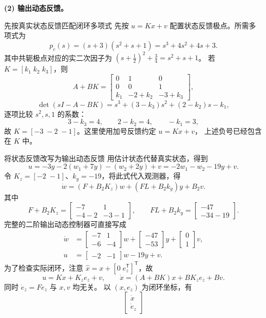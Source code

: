 \documentclass[11pt]{article}
\begin{document}
\begin{solution}
\medskip\textbf{(2) 输出动态反馈。}
\begin{proofstep}{先按真实状态反馈匹配闭环多项式}
先按 $u=Kx+v$ 配置状态反馈极点。所需多项式为
\[
 p_c(s)=(s+3)(s^2+s+1)=s^3+4s^2+4s+3.
\]
其中共轭极点对应的实二次因子为
$\left(s+\tfrac12\right)^2+\tfrac34=s^2+s+1$。
若 $K=[k_1\;k_2\;k_3]$，则
\[
 A+BK=\begin{bmatrix}0&1&0\\0&0&1\\k_1&-2+k_2&-3+k_3\end{bmatrix},
\]
\[
 \det(sI-A-BK)=s^3+(3-k_3)s^2+(2-k_2)s-k_1,
\]
逐项比较 $s^2,s,1$ 的系数：
\[
 3-k_3=4,\qquad 2-k_2=4,\qquad -k_1=3,
\]
故 $K=[-3\;-2\;-1]$。这里使用加号反馈约定 $u=Kx+v$，
上述负号已经包含在 $K$ 中。
\end{proofstep}
\begin{proofstep}{将状态反馈改写为输出动态反馈}
用估计状态代替真实状态，得到
\[
 \boxed{u=-3y-2(w_1+7y)-(w_2+2y)+v
 =-2w_1-w_2-19y+v.}
\]
令 $K_z=[-2\;-1]$、$k_y=-19$，将此式代入观测器，得
\[
 \dot w=(F+B_2K_z)w+(FL+B_2k_y)y+B_2v.
\]
其中
\[
 F+B_2K_z=\begin{bmatrix}-7&1\\-4-2&-3-1\end{bmatrix},\qquad
 FL+B_2k_y=\begin{bmatrix}-47\\-34-19\end{bmatrix}.
\]
完整的二阶输出动态控制器可直接写成
\[
 \boxed{\begin{aligned}
  \dot w&=\begin{bmatrix}-7&1\\-6&-4\end{bmatrix}w
   +\begin{bmatrix}-47\\-53\end{bmatrix}y
   +\begin{bmatrix}0\\1\end{bmatrix}v,\\
  u&=\begin{bmatrix}-2&-1\end{bmatrix}w-19y+v.
 \end{aligned}}
\]
为了检查实际闭环，注意 $\hat x=x+[0\;e_z^{\mathsf T}]^{\mathsf T}$，故
\[
 u=Kx+K_ze_z+v,\qquad
 \dot x=(A+BK)x+BK_ze_z+Bv.
\]
同时 $\dot e_z=Fe_z$ 与 $x,v$ 均无关。
以 $(x,e_z)$ 为闭环坐标，有
\[
 \begin{bmatrix}\dot x\\\dot e_z\end{bmatrix}
\]
\end{proofstep}
\end{solution}
\end{document}
